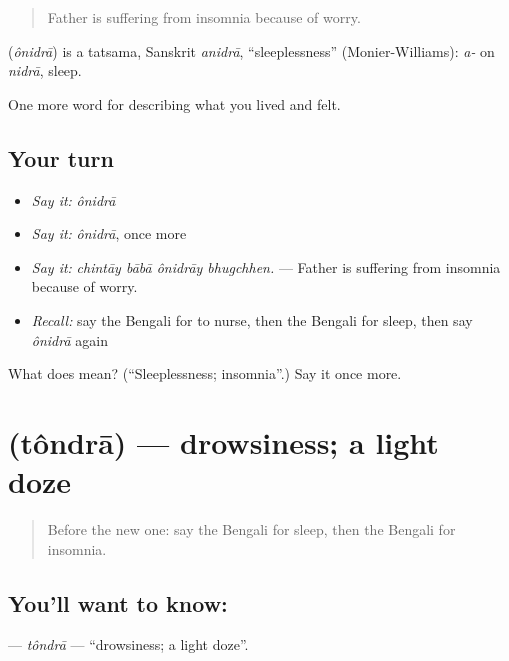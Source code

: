 \begin{quote}
Father is suffering from insomnia because of worry.
\end{quote}

\begin{cousinweb}
\textbf{} (\emph{ônidrā}) is a tatsama, Sanskrit \emph{anidrā}, \textquotedblleft{}sleeplessness\textquotedblright{} (Monier-Williams): \emph{a-} on \emph{nidrā}, sleep.
\end{cousinweb}

\begin{grammarlens}[title={What you've built}]
One more word for describing what you lived and felt.
\end{grammarlens}

\subsection*{Your turn}
\begin{itemize}
\raggedright
  \item \emph{Say it:} \emph{ônidrā}
  \item \emph{Say it:} \emph{ônidrā}, once more
  \item \emph{Say it:} \emph{chintāy bābā ônidrāy bhugchhen.} — Father is suffering from insomnia because of worry.
  \item \emph{Recall:} say the Bengali for to nurse, then the Bengali for sleep, then say \emph{ônidrā} again
\end{itemize}

\begin{tcolorbox}[breakable,colback=teal!4,colframe=teal!35!black,title={Before you move on}]
What does  mean? (\textquotedblleft{}Sleeplessness; insomnia\textquotedblright{}.) Say it once more.
\end{tcolorbox}
\section[\texorpdfstring{\bn{তন্দ্রা} (tôndrā)}{তন্দ্রা (tôndrā)}]{ (tôndrā) — drowsiness; a light doze}

\label{lesson:BN-C479-tondra}



\begin{quote}
Before the new one: say the Bengali for sleep, then the Bengali for insomnia.
\end{quote}

\subsection*{You'll want to know: }
\textbf{} — \emph{tôndrā} — \textquotedblleft{}drowsiness; a light doze\textquotedblright{}.

